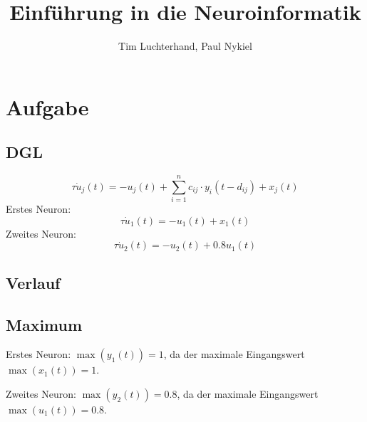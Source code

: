 \documentclass[DIN, pagenumber=false, fontsize=11pt, parskip=half]{scrartcl}
\title{Einführung in die Neuroinformatik}
\author{Tim Luchterhand, Paul Nykiel}
\begin{document}
    \maketitle
    \section{Aufgabe}
    \subsection{DGL}
    \begin{equation*}
        \tau \dot{u}_j(t) = -u_j(t) + \sum_{i=1}^n c_{ij} \cdot y_i(t-d_{ij}) + x_j(t)
    \end{equation*}
    Erstes Neuron:
    \begin{equation*}
        \tau \dot{u}_1(t) = -u_1(t) + x_1(t)
    \end{equation*}
    Zweites Neuron:
    \begin{equation*}
        \tau \dot{u}_2(t) = -u_2(t) + 0.8 u_1(t) 
    \end{equation*}
    \subsection{Verlauf}
    \subsection{Maximum} 
    Erstes Neuron: $\max(y_1(t)) = 1$, da der maximale Eingangswert $\max(x_1(t)) = 1$. 

    Zweites Neuron: $\max(y_2(t)) = 0.8$, da der maximale Eingangswert $\max(u_1(t)) = 0.8$. 
\end{document}
